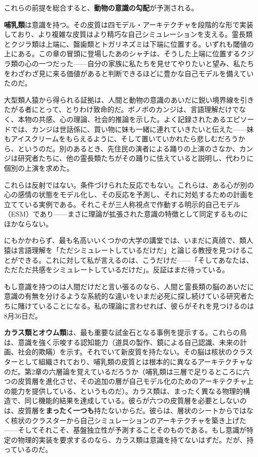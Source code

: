 \documentclass[11pt, twoside, openright]{book}
\begin{document}
これらの前提を総合すると、\textbf{動物の意識の勾配}が予測される。

\textbf{哺乳類}は意識を持つ。その皮質は四モデル・アーキテクチャを段階的な形で実装しており、より複雑な皮質はより精巧な自己シミュレーションを支える。霊長類とクジラ類は上端に、齧歯類とトガリネズミは下端に位置する。いずれも閾値の上にある。この章の冒頭に登場したあのシャチは、そうした上端に位置するクジラ類の心の一つだった------自分の家族に私たちを見せてやりたいと望み、私たちをわざわざ見に来る価値があると判断できるほどに豊かな自己モデルを備えていたのだ。

大型類人猿から得られる証拠は、人間と動物の意識のあいだに鋭い境界線を引きたがる者にとって、とりわけ致命的だ。ボノボのカンジは、言語理解だけでなく、本物の共感、心の理論、社会的推論を示した。よく記録されたあるエピソードでは、カンジは世話係に、買い物に妹も一緒に連れていきたいと伝えた------妹もアイスクリームをもらえるように、そして置いていかれたら悲しむだろうから、というのだ。別のあるとき、先住民の演者による踊りの上演のさなか、カンジは研究者たちに、他の霊長類たちがその踊りに怯えていると説明し、代わりに個別の上演を求めた。

これらは反射ではない。条件づけられた反応でもない。これらは、ある心が別の心の感情の状態をモデル化し、その反応を予測し、それに対処するための計画を立てている実例である。それこそが三人称視点で作動する明示的自己モデル（ESM）であり------まさに理論が拡張された意識の特徴として同定するものにほかならない。

にもかかわらず、最も名高いいくつかの大学の講堂では、いまだに真顔で、類人猿は言語理解を「ただシミュレートしているだけだ」と論じる教授を見つけることができる。これに対して私が言えるのは、こうだけだ------「そしてあなたは、ただただ共感をシミュレートしているだけだ」。反証はまだ待っている。

もし意識を持つのは人間だけだと言い張るのなら、人間と霊長類の脳のあいだに意識の有無を分けるような系統的な違いをいまだ必死に探し続けている研究者たちに賭けていることになる。私の理論に言わせれば、彼らがそれを見つけるのは8月36日だ。

\textbf{カラス類とオウム類}は、最も重要な試金石となる事例を提示する。これらの鳥は、意識を強く示唆する認知能力（道具の製作、鏡による自己認識、未来の計画、社会的欺瞞）を示す。それでいて新皮質を持たない。その脳は核状のクラスターとして組織されており、哺乳類の皮質とは根本的に異なるアーキテクチャなのだ。第2章の六層論を覚えているだろうか（哺乳類は三層で足りるところに六つの皮質層を進化させ、その追加の層が自己モデル化のためのアーキテクチャ上の能力を提供している、というものだ）。カラス類は、まったく異なる物理的構造で、同じ機能的結果を達成している。彼らが六つの皮質層を必要としないのは、皮質層を\textbf{まったく一つも}持たないからだ。彼らは、層状のシートからではなく核状のクラスターから自己シミュレーションのアーキテクチャを築き上げた------そしてそれこそ、基盤独立性が予測することそのものである。もし意識が特定の物理的実装を要求するのなら、カラス類は意識を持てないはずだ。だが、持っているのだ。
\end{document}
